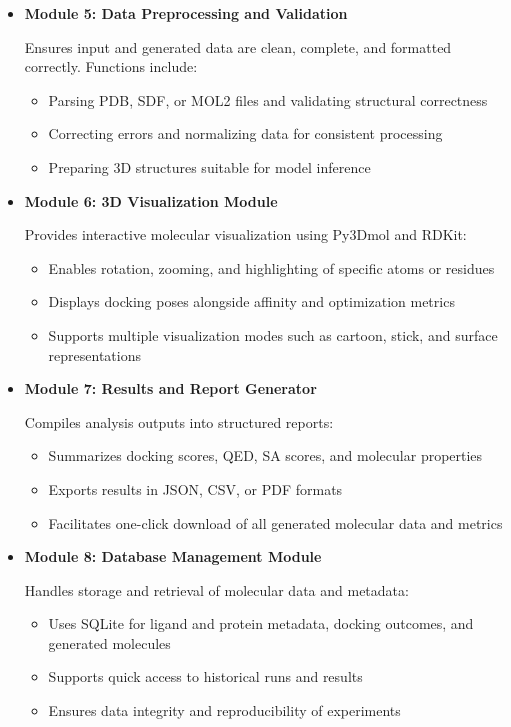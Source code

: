 \documentclass[12pt,a4]{report}
\begin{document}
\begin{itemize}
    \item \textbf{Module 5: Data Preprocessing and Validation}
    
    \hspace{0.3in}Ensures input and generated data are clean, complete, and formatted correctly. Functions include:
    \begin{itemize}
        \item Parsing PDB, SDF, or MOL2 files and validating structural correctness
        \item Correcting errors and normalizing data for consistent processing
        \item Preparing 3D structures suitable for model inference
    \end{itemize}

    \item \textbf{Module 6: 3D Visualization Module}
    
    \hspace{0.3in}Provides interactive molecular visualization using Py3Dmol and RDKit:
    \begin{itemize}
        \item Enables rotation, zooming, and highlighting of specific atoms or residues
        \item Displays docking poses alongside affinity and optimization metrics
        \item Supports multiple visualization modes such as cartoon, stick, and surface representations
    \end{itemize}

    \item \textbf{Module 7: Results and Report Generator}
    
    \hspace{0.3in}Compiles analysis outputs into structured reports:
    \begin{itemize}
        \item Summarizes docking scores, QED, SA scores, and molecular properties
        \item Exports results in JSON, CSV, or PDF formats
        \item Facilitates one-click download of all generated molecular data and metrics
    \end{itemize}

    \item \textbf{Module 8: Database Management Module}
    
    \hspace{0.3in}Handles storage and retrieval of molecular data and metadata:
    \begin{itemize}
        \item Uses SQLite for ligand and protein metadata, docking outcomes, and generated molecules
        \item Supports quick access to historical runs and results
        \item Ensures data integrity and reproducibility of experiments
    \end{itemize}


\end{itemize}
\end{document}
